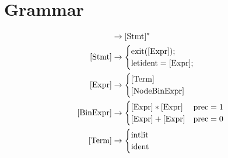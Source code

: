 \documentclass[12pt]{article}
\begin{document}
\section*{Grammar}

\begin{align}
    [\text{Prog}] &\to [\text{Stmt}]^* \\
    [\text{Stmt}] &\to
    \begin{cases}
        \text{exit}([\text{Expr}]); \\
        \text{let}\space\text{ident} = [\text{Expr}];
    \end{cases} \\
    [\text{Expr}] &\to
    \begin{cases}
        [\text{Term}] \\
        [\text{NodeBinExpr}]
    \end{cases} \\
    [\text{BinExpr}] &\to
    \begin{cases}
        [\text{Expr}] * [\text{Expr}] & \text{prec} = 1 \\
        [\text{Expr}] + [\text{Expr}] & \text{prec} = 0 \\
    \end{cases} \\
    [\text{Term}] &\to
    \begin{cases}
        \text{intlit} \\
        \text{ident}
    \end{cases}
\end{align}
\end{document}
